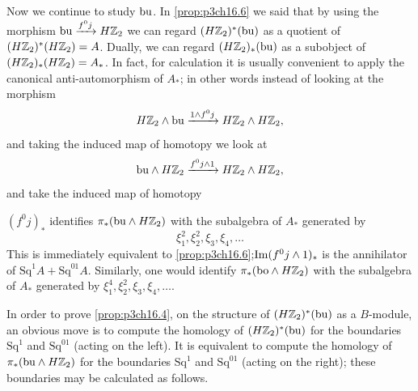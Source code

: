 \documentclass[../main]{subfiles}
\begin{document}
Now we continue to study $\mathrm{bu}$. In \ref{prop:p3ch16.6} we said that by using the morphism $\te{bu}\vra{f^0j}H\bZ_2$ we can regard $(H\mathbb{Z}_2)^\ast(\mathrm{bu})$ as a quotient of $(H\mathbb{Z}_2)^\ast(H\mathbb{Z}_2)=A$. Dually, we can regard $(H\mathbb{Z}_2)_\ast(\mathrm{bu})$ as a subobject of $(H\mathbb{Z}_2)_\ast(H\mathbb{Z}_2)=A_\ast$. In fact, for calculation it is usually convenient to apply the canonical anti-automorphism of $A_\ast$; in other words instead of looking at the morphism \begin{equation*}
    H\bZ_2\wedge \te{bu}\vra{1 \wedge f^{0}j} H\bZ_2 \wedge H\bZ_2, 
\end{equation*}
and taking the induced map of homotopy we look at \begin{equation*}
    \te{bu}\wedge H\bZ_2 \vra{f^{0}j \wedge1 } H\bZ_2 \wedge H\bZ_2, 
\end{equation*}
and take the induced map of homotopy 
\begin{lemma} \label{lem:p3ch16.8}
 $(f^{0}j)_{\ast}$ identifies $\pi_{\ast}(\mathrm{bu} \wedge H\mathbb{Z}_2)$ with the subalgebra of $A_{\ast}$ generated by \begin{equation*}
     \xi_{1}^{2}, \xi_{2}^{2}, \xi_{3}, \xi_{4}, \dots
 \end{equation*}
 This is immediately equivalent to \ref{prop:p3ch16.6};$\mathrm{Im}(f^{0}j\wedge1)_{\ast}$ is the annihilator of $\mathrm{Sq}^{1}A+\mathrm{Sq}^{01}A.$
 Similarly, one would identify $\pi_\ast(\mathrm{bo}\wedge H\mathbb{Z}_2)$ with the subalgebra of $A_\ast$ generated by $\xi_1^4,\xi_2^2,\xi_3,\xi_4,\dots$.
\end{lemma}
In order to prove \ref{prop:p3ch16.4}, on the structure of $(H\mathbb{Z}_2)^\ast(\mathrm{bu})$ as a $B$-module, an obvious move is to compute the homology of $(H\mathbb{Z}_2)^\ast(\mathrm{bu})$ for the boundaries $\mathrm{Sq}^1$ and $\mathrm{Sq}^{01}$ (acting on the left). It is equivalent to compute the homology of $\pi_\ast(\mathrm{bu}\wedge H\mathbb{Z}_2)$ for the boundaries $\mathrm{Sq}^1$ and $\mathrm{Sq}^{01}$ (acting on the right); these boundaries may be calculated as follows.
\end{document}
